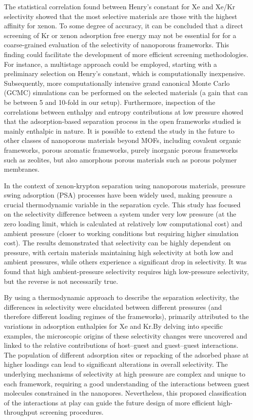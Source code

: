 \documentclass[main.tex]{subfiles}
\begin{document}
The statistical correlation found between Henry's constant for Xe and Xe/Kr selectivity showed that the most selective materials are those with the highest affinity for xenon. To some degree of accuracy, it can be concluded that a direct screening of Kr or xenon adsorption free energy may not be essential for for a coarse-grained evaluation of the selectivity of nanoporous frameworks. This finding could facilitate the development of more efficient screening methodologies. For instance, a multistage approach could be employed, starting with a preliminary selection on Henry's constant, which is computationally inexpensive. Subsequently, more computationally intensive grand canonical Monte Carlo (GCMC) simulations can be performed on the selected materials (a gain that can be between 5 and 10-fold in our setup). Furthermore, inspection of the correlations between enthalpy and entropy contributions at low pressure showed that the adsorption-based separation process in the open frameworks studied is mainly enthalpic in nature. It is possible to extend the study in the future to other classes of nanoporous materials beyond MOFs, including covalent organic frameworks, porous aromatic frameworks, purely inorganic porous frameworks such as zeolites, but also amorphous porous materials such as porous polymer membranes.

In the context of xenon-krypton separation using nanoporous materials, pressure swing adsorption (PSA) processes have been widely used, making pressure a crucial thermodynamic variable in the separation cycle. This study has focused on the selectivity difference between a system under very low pressure (at the zero loading limit, which is calculated at relatively low computational cost) and ambient pressure (closer to working conditions but requiring higher simulation cost). The results demonstrated that selectivity can be highly dependent on pressure, with certain materials maintaining high selectivity at both low and ambient pressures, while others experience a significant drop in selectivity. It was found that high ambient-pressure selectivity requires high low-pressure selectivity, but the reverse is not necessarily true.

By using a thermodynamic approach to describe the separation selectivity, the differences in selectivity were elucidated between different pressures (and therefore different loading regimes of the frameworks), primarily attributed to the variations in adsorption enthalpies for Xe and Kr.By delving into specific examples, the microscopic origins of these selectivity changes were uncovered and linked to the relative contributions of host--guest and guest--guest interactions. The population of different adsorption sites or repacking of the adsorbed phase at higher loadings can lead to significant alterations in overall selectivity. The underlying mechanisms of selectivity at high pressure are complex and unique to each framework, requiring a good understanding of the interactions between guest molecules constrained in the nanopores. Nevertheless, this proposed classification of the interactions at play can guide the future design of more efficient high-throughput screening procedures.
\end{document}
